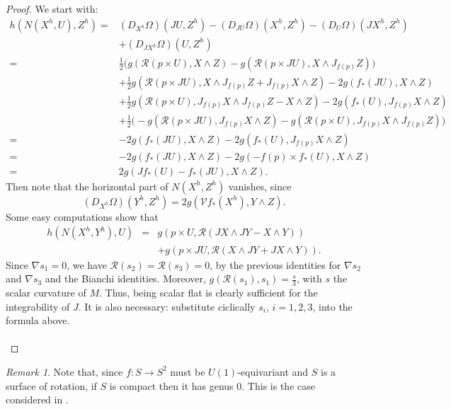 \documentclass[11pt]{amsart}
\theoremstyle{definition}
\theoremstyle{plain}
\theoremstyle{definition}
\theoremstyle{plain}
\theoremstyle{remark}
\newtheorem{rmk}[Def]{Remark}
\theoremstyle{plain}
\newcommand{\n}{\nabla}
\begin{document}
\begin{proof}

We start with:
 	\[
 	\begin{split} 
 	 h(N(X^h,U),Z^h)=&(D_{X^h} \Omega)(JU, Z^h)-(D_{JU} \Omega)(X^h, Z^h) -(D_{U} \Omega)(JX^h, Z^h) \\
 	 & + (D_{JX^h} \Omega)(U, Z^h) \\
 	  = &\frac{1}{2}\bigg(  g(\mathcal{R} (p\times U),X\wedge Z)-   g(\mathcal{R}(p \times J U), X \wedge J_{f(p)}Z) \bigg)    \\ 	
 	  &+  \frac{1}{2}g( \mathcal{R}(p \times J U), X \wedge J_{f(p)}Z + J_{f(p)}X \wedge Z)-2g(f_*(JU), X \wedge Z) \\
 	  &+  \frac{1}{2}g( \mathcal{R}(p \times  U), J_{f(p)} X \wedge J_{f(p)}Z -X \wedge Z)-2g(f_*(U), J_{f(p)}X \wedge Z) \\
 	  &+\frac{1}{2}\bigg(  -g(\mathcal{R} (p\times JU), J_{f(p)}X \wedge Z   ) -    g(\mathcal{R}(p \times U), J_{f(p)}X \wedge J_{f(p)}Z) \bigg)    \\ 	
 	  = & -2g(f_*(JU), X \wedge Z) -2g(f_*(U), J_{f(p)}X \wedge Z) \\
 	  = &  -2g(f_*(JU), X \wedge Z) - 2g(-f(p) \times f_*(U), X \wedge Z)  	\\
    = & 2g(  J f_*(U)      - f_*(JU), X \wedge Z).
  \end{split}
	\]
	Then note that the horizontal part of $N(X^h,Z^h)$ vanishes, since 
\begin{equation}\label{eq2}
(D_{X^h} \Omega)(Y^h, Z^h)= 2g(\mathcal{V} f_*(X^h), Y \wedge Z).
\end{equation}
Some easy computations show that 
$$
\begin{array}{lcc}
 h(N(X^h,Y^h),U) &= &g( p \times U, \mathcal{R}(JX \wedge JY- X \wedge Y))\\[3pt]
 &&+ g( p \times JU, \mathcal{R}(X \wedge JY+J X \wedge Y)).
\end{array}
$$
Since $\n s_1=0$, we have  $\mathcal{R}(s_2)=\mathcal{R}(s_3)=0$, by  the previous identities for $\n s_2$ and $\n s_3$ and  the Bianchi identities. Moreover, $g(\mathcal{R}(s_1), s_1)=\frac{s}{3}  $, with $s$ the scalar curvature of $M$. Thus, being scalar flat is clearly sufficient for the integrability of $J$. It is also necessary: substitute ciclically $s_i$, $i=1,2,3$,  into the formula above. \\ \\
\end{proof}
\begin{rmk} 
Note that,  since  $f: S\to S^2$  must be $U(1)$-equivariant and $S$ is a surface of rotation, if $S$ is compact then it has genus $0$. This is the case considered in \cite{ADM}.
\end{rmk}
\end{document}
